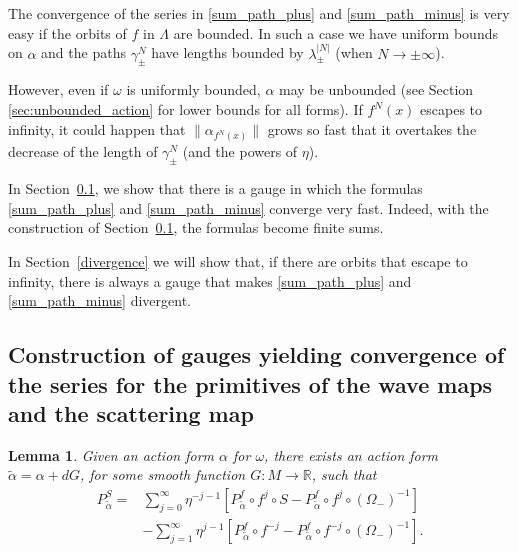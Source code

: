 \documentclass[11pt]{amsart}
\newtheorem{lem}[thm]{Lemma}
\theoremstyle{definition}
\theoremstyle{remark}
\numberwithin{equation}{section}
\begin{document}
The convergence of the series in \eqref{sum_path_plus}
and \eqref{sum_path_minus}  is very easy if the orbits of $f$ in $\Lambda$ are bounded. In such
a case we have uniform bounds on $ \alpha $ and the
paths $\gamma^N_\pm$ have lengths
bounded by $\lambda_\pm^{|N|}$ (when $N \rightarrow \pm \infty$).

However, even if $\omega$ is uniformly bounded,  $\alpha$ may
be unbounded (see  Section \ref{sec:unbounded_action} for lower bounds
for all forms).
If $f^N(x)$ escapes to infinity,
it could happen that $\|\alpha_{f^N(x)}\|$ grows
so fast that it overtakes the decrease of the length of $\gamma^N_\pm$ (and the powers of $\eta$).


In Section~\ref{convergence},
we show that there is a gauge in which the
formulas \eqref{sum_path_plus} and \eqref{sum_path_minus}
converge very fast.
Indeed, with the construction of Section~\ref{convergence}, the
formulas become finite  sums.

In Section~\ref{divergence} we will show
that, if there are orbits that escape to infinity, there is
always a gauge that makes
\eqref{sum_path_plus} and \eqref{sum_path_minus}
divergent.






\subsection{Construction of gauges yielding  convergence of the series
   for the primitives of the wave maps and the scattering map}
\label{convergence}


\begin{lem}\label{lem:construction_G}
Given an action form $\alpha$ for $\omega$, there exists an action form $\tilde\alpha=\alpha+dG$, for some smooth function $G:M\to\mathbb{R}$, such that
\begin{equation}
\label{eqn:primitive_SM_good_action}
\begin{split}
P^S_{\tilde\alpha}=& \sum_{j=0}^{\infty}\eta^{-j-1}[P^f_{\tilde\alpha}\circ f^j\circ S -P^f_{\tilde\alpha}\circ f^j\circ(\Omega_-)^{-1}] \\
& -\sum_{j=1}^{\infty}\eta^{j-1}[P^f_{\tilde\alpha}\circ f^{-j} - P^f_{\tilde\alpha}\circ f^{-j}\circ (\Omega_-)^{-1}] .
\end{split}
\end{equation}
\end{lem}
\end{document}
